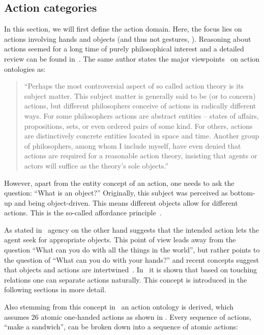 \subsection{Action categories}
\label{ssec:action_methods_actioncategories}

In this section, we will first define the action domain.
Here, the focus lies on actions involving hands and objects (and thus not gestures, \etc).
Reasoning about actions seemed for a long time of purely philosophical interest and a detailed review can be found in~\cite{aune1977reason}.
The same author states the major viewpoints~\cite{worgotter2013simple} on action ontologies as:~\cite[p. 195]{aune1988action}

\begin{quote}
``Perhaps the most controversial aspect of so called action theory is its subject matter.
This subject matter is generally said to be (or to concern) actions, but different philosophers conceive of actions in radically different ways. 
For some philosophers actions are abstract entities – states of affairs, propositions, sets, or even ordered pairs of some kind. 
For others, actions are distinctively concrete entities located in space and time. 
Another group of philosophers, among whom I include myself, have even denied that actions are required for a reasonable action theory, insisting that agents or actors will suffice as the theory's sole objects.''
\end{quote}

However, apart from the entity concept of an action, one needs to ask the question: ``What is an object?''
Originally, this subject was perceived as bottom-up and being object-driven.
This means different objects allow for different actions.
This is the so-called affordance principle~\cite{shaw2017perceiving}.

As stated in~\cite{worgotter2013simple} agency on the other hand suggests that the intended action lets the agent seek for appropriate objects.
This point of view leads away from the question ``What can you do with all the things in the world'', but rather points to the question of ``What can you do with your hands?'' and recent concepts suggest that objects and actions are intertwined~\cite{turchin1993cybernetic}.
In~\textcite{worgotter2013simple} it is shown that based on touching relations one can separate actions naturally.
This concept is introduced in the following sections in more detail.

Also stemming from this concept in~\cite{worgotter2013simple} an action ontology is derived, which assumes 26 atomic one-handed actions as shown in .
Every sequence of actions, \eg ``make a sandwich'', can be broken down into a sequence of atomic actions:

